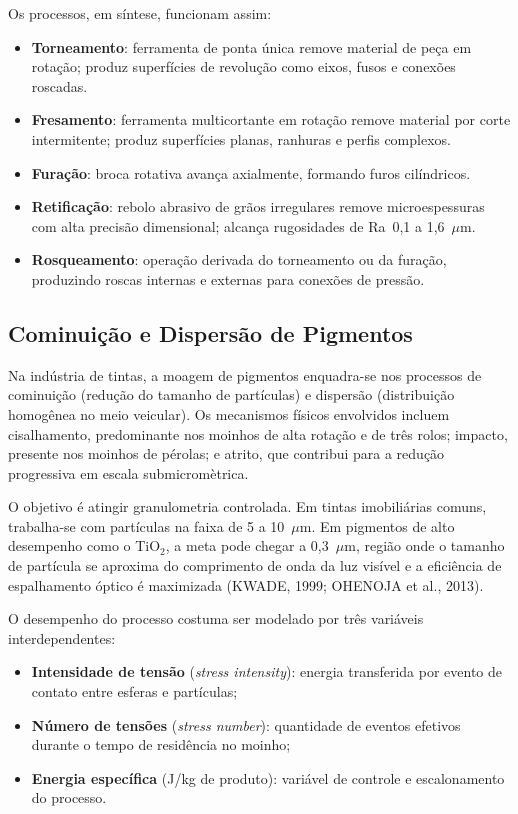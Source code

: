 \documentclass[
  12pt,
  a4paper,
  oneside,
  brazil,
  chapter=TITLE
]{article}
\providecommand{\tightlist}{%
  \setlength{\itemsep}{0pt}\setlength{\parskip}{0pt}}
\begin{document}
Os processos, em síntese, funcionam assim:

\begin{itemize}
\tightlist
\item \textbf{Torneamento}: ferramenta de ponta única remove material de peça
  em rotação; produz superfícies de revolução como eixos, fusos e conexões
  roscadas.
\item \textbf{Fresamento}: ferramenta multicortante em rotação remove material
  por corte intermitente; produz superfícies planas, ranhuras e perfis
  complexos.
\item \textbf{Furação}: broca rotativa avança axialmente, formando furos
  cilíndricos.
\item \textbf{Retificação}: rebolo abrasivo de grãos irregulares remove
  microespessuras com alta precisão dimensional; alcança rugosidades de
  Ra~0,1 a 1,6~$\mu$m.
\item \textbf{Rosqueamento}: operação derivada do torneamento ou da furação,
  produzindo roscas internas e externas para conexões de pressão.
\end{itemize}

\subsection{Cominuição e Dispersão de Pigmentos}

Na indústria de tintas, a moagem de pigmentos enquadra-se nos processos de
cominuição (redução do tamanho de partículas) e dispersão (distribuição
homogênea no meio veicular). Os mecanismos físicos envolvidos incluem
cisalhamento, predominante nos moinhos de alta rotação e de três rolos;
impacto, presente nos moinhos de pérolas; e atrito, que contribui para a
redução progressiva em escala submicromètrica.

O objetivo é atingir granulometria controlada. Em tintas imobiliárias comuns,
trabalha-se com partículas na faixa de 5 a 10~$\mu$m. Em pigmentos de alto
desempenho como o TiO$_2$, a meta pode chegar a 0,3~$\mu$m, região onde o
tamanho de partícula se aproxima do comprimento de onda da luz visível e a
eficiência de espalhamento óptico é maximizada (KWADE, 1999; OHENOJA et al., 2013).

O desempenho do processo costuma ser modelado por três variáveis
interdependentes:

\begin{itemize}
\tightlist
\item \textbf{Intensidade de tensão} (\textit{stress intensity}): energia
  transferida por evento de contato entre esferas e partículas;
\item \textbf{Número de tensões} (\textit{stress number}): quantidade de
  eventos efetivos durante o tempo de residência no moinho;
\item \textbf{Energia específica} (J/kg de produto): variável de controle e
  escalonamento do processo.
\end{itemize}
\end{document}
